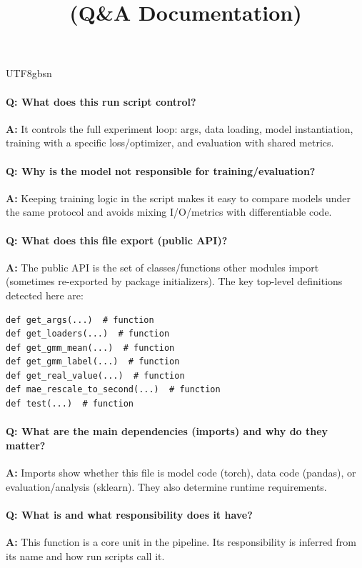 \documentclass[11pt]{article}
\title{\texttt{\detokenize{run_d2co.py}} (Q\&A Documentation)}
\author{}
\date{}
\begin{document}
\begin{CJK*}{UTF8}{gbsn}
\maketitle

\paragraph{Q: What does this run script control?}
\textbf{A:} It controls the full experiment loop: args, data loading, model instantiation, training with a specific loss/optimizer, and evaluation with shared metrics.

\paragraph{Q: Why is the model not responsible for training/evaluation?}
\textbf{A:} Keeping training logic in the script makes it easy to compare models under the same protocol and avoids mixing I/O/metrics with differentiable code.

\paragraph{Q: What does this file export (public API)?}
\textbf{A:} The public API is the set of classes/functions other modules import (sometimes re-exported by package initializers). The key top-level definitions detected here are:

\begin{Verbatim}[fontsize=\small]
def get_args(...)  # function
def get_loaders(...)  # function
def get_gmm_mean(...)  # function
def get_gmm_label(...)  # function
def get_real_value(...)  # function
def mae_rescale_to_second(...)  # function
def test(...)  # function
\end{Verbatim}

\paragraph{Q: What are the main dependencies (imports) and why do they matter?}
\textbf{A:} Imports show whether this file is model code (torch), data code (pandas), or evaluation/analysis (sklearn). They also determine runtime requirements.

\vspace{1mm}


\paragraph{Q: What is \texttt{} and what responsibility does it have?}
\textbf{A:} This function is a core unit in the pipeline. Its responsibility is inferred from its name and how run scripts call it.


\end{CJK*}
\end{document}
